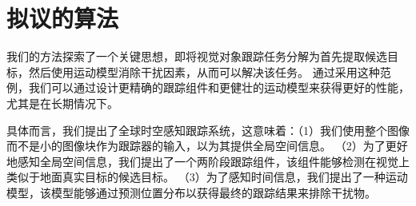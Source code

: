 \section{拟议的算法}
\label{sec:method}

我们的方法探索了一个关键思想，即将视觉对象跟踪任务分解为首先提取候选目标，然后使用运动模型消除干扰因素，从而可以解决该任务。
通过采用这种范例，我们可以通过设计更精确的跟踪组件和更健壮的运动模型来获得更好的性能，尤其是在长期情况下。

具体而言，我们提出了全球时空感知跟踪系统，这意味着：（1）我们使用整个图像而不是小的图像块作为跟踪器的输入，以为其提供全局空间信息。 （2）为了更好地感知全局空间信息，我们提出了一个两阶段跟踪组件，该组件能够检测在视觉上类似于地面真实目标的候选目标。 （3）为了感知时间信息，我们提出了一种运动模型，该模型能够通过预测位置分布以获得最终的跟踪结果来排除干扰物。

